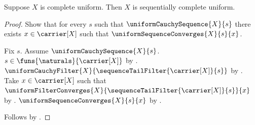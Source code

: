 \begin{theorem}\label{complete_uniform_implies_sequentially_complete}
    Suppose $X$ is complete uniform.
    Then $X$ is sequentially complete uniform.
\end{theorem}
\begin{proof}
    Show that for every $s$ such that $\uniformCauchySequence{X}{s}$
        there exists $x\in\carrier[X]$ such that
        $\uniformSequenceConverges{X}{s}{x}$.
    \begin{subproof}
        Fix $s$.
        Assume $\uniformCauchySequence{X}{s}$.
        $s\in\funs{\naturals}{\carrier[X]}$
            by .
        $\uniformCauchyFilter{X}
            {\sequenceTailFilter{\carrier[X]}{s}}$
            by .
        Take $x\in\carrier[X]$ such that
            $\uniformFilterConverges{X}
                {\sequenceTailFilter{\carrier[X]}{s}}{x}$
            by .
        $\uniformSequenceConverges{X}{s}{x}$
            by .
    \end{subproof}
    Follows by .
\end{proof}
